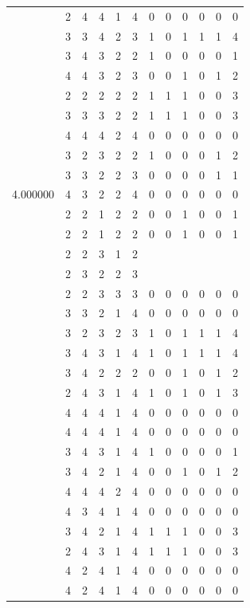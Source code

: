 \documentclass[]{book}
\theoremstyle{definition}
\theoremstyle{definition}
\theoremstyle{definition}
\theoremstyle{remark}
\begin{document}
\begin{table}
{\begin{tabular}[t]{rrrrrrrrrrrr}
 & 2 & 4 & 4 & 1 & 4 & 0 & 0 & 0 & 0 & 0 & 0\\
 & 3 & 3 & 4 & 2 & 3 & 1 & 0 & 1 & 1 & 1 & 4\\
 & 3 & 4 & 3 & 2 & 2 & 1 & 0 & 0 & 0 & 0 & 1\\
 & 4 & 4 & 3 & 2 & 3 & 0 & 0 & 1 & 0 & 1 & 2\\
 & 2 & 2 & 2 & 2 & 2 & 1 & 1 & 1 & 0 & 0 & 3\\
 & 3 & 3 & 3 & 2 & 2 & 1 & 1 & 1 & 0 & 0 & 3\\
 & 4 & 4 & 4 & 2 & 4 & 0 & 0 & 0 & 0 & 0 & 0\\
 & 3 & 2 & 3 & 2 & 2 & 1 & 0 & 0 & 0 & 1 & 2\\
 & 3 & 3 & 2 & 2 & 3 & 0 & 0 & 0 & 0 & 1 & 1\\
4.000000 & 4 & 3 & 2 & 2 & 4 & 0 & 0 & 0 & 0 & 0 & 0\\
 & 2 & 2 & 1 & 2 & 2 & 0 & 0 & 1 & 0 & 0 & 1\\
 & 2 & 2 & 1 & 2 & 2 & 0 & 0 & 1 & 0 & 0 & 1\\
 & 2 & 2 & 3 & 1 & 2 &  &  &  &  &  & \\
 & 2 & 3 & 2 & 2 & 3 &  &  &  &  &  & \\
 & 2 & 2 & 3 & 3 & 3 & 0 & 0 & 0 & 0 & 0 & 0\\
 & 3 & 3 & 2 & 1 & 4 & 0 & 0 & 0 & 0 & 0 & 0\\
 & 3 & 2 & 3 & 2 & 3 & 1 & 0 & 1 & 1 & 1 & 4\\
 & 3 & 4 & 3 & 1 & 4 & 1 & 0 & 1 & 1 & 1 & 4\\
 & 3 & 4 & 2 & 2 & 2 & 0 & 0 & 1 & 0 & 1 & 2\\
 & 2 & 4 & 3 & 1 & 4 & 1 & 0 & 1 & 0 & 1 & 3\\
 & 4 & 4 & 4 & 1 & 4 & 0 & 0 & 0 & 0 & 0 & 0\\
 & 4 & 4 & 4 & 1 & 4 & 0 & 0 & 0 & 0 & 0 & 0\\
 & 3 & 4 & 3 & 1 & 4 & 1 & 0 & 0 & 0 & 0 & 1\\
 & 3 & 4 & 2 & 1 & 4 & 0 & 0 & 1 & 0 & 1 & 2\\
 & 4 & 4 & 4 & 2 & 4 & 0 & 0 & 0 & 0 & 0 & 0\\
 & 4 & 3 & 4 & 1 & 4 & 0 & 0 & 0 & 0 & 0 & 0\\
 & 3 & 4 & 2 & 1 & 4 & 1 & 1 & 1 & 0 & 0 & 3\\
 & 2 & 4 & 3 & 1 & 4 & 1 & 1 & 1 & 0 & 0 & 3\\
 & 4 & 2 & 4 & 1 & 4 & 0 & 0 & 0 & 0 & 0 & 0\\
 & 4 & 2 & 4 & 1 & 4 & 0 & 0 & 0 & 0 & 0 & 0\\

\end{tabular}}
\end{table}
\end{document}
